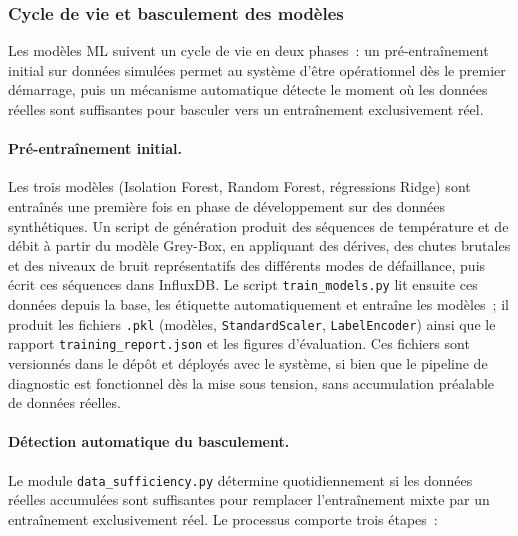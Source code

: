 \subsubsection{Cycle de vie et basculement des modèles}

Les modèles ML suivent un cycle de vie en deux phases~: un pré-entraînement initial sur données simulées permet au système d'être opérationnel dès le premier démarrage, puis un mécanisme automatique détecte le moment où les données réelles sont suffisantes pour basculer vers un entraînement exclusivement réel.

\paragraph{Pré-entraînement initial.}
Les trois modèles (Isolation Forest, Random Forest, régressions Ridge) sont entraînés une première fois en phase de développement sur des données synthétiques. Un script de génération produit des séquences de température et de débit à partir du modèle Grey-Box, en appliquant des dérives, des chutes brutales et des niveaux de bruit représentatifs des différents modes de défaillance, puis écrit ces séquences dans InfluxDB. Le script \texttt{train\_models.py} lit ensuite ces données depuis la base, les étiquette automatiquement et entraîne les modèles~; il produit les fichiers \texttt{.pkl} (modèles, \texttt{StandardScaler}, \texttt{LabelEncoder}) ainsi que le rapport \texttt{training\_report.json} et les figures d'évaluation. Ces fichiers sont versionnés dans le dépôt et déployés avec le système, si bien que le pipeline de diagnostic est fonctionnel dès la mise sous tension, sans accumulation préalable de données réelles.

\paragraph{Détection automatique du basculement.}
Le module \texttt{data\_sufficiency.py} détermine quotidiennement si les données réelles accumulées sont suffisantes pour remplacer l'entraînement mixte par un entraînement exclusivement réel. Le processus comporte trois étapes~:

